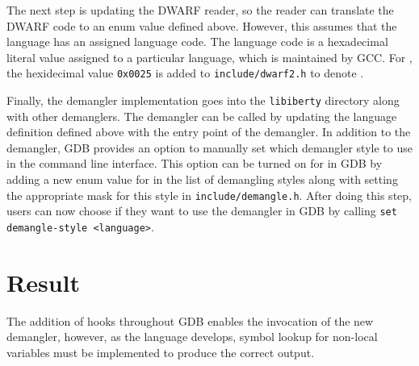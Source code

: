 The next step is updating the DWARF reader, so the reader can translate the DWARF code to an enum value defined
above. However, this assumes that the language has an assigned language code.
The language code is a hexadecimal literal value assigned to a particular
language, which is maintained by GCC. For \CFA, the hexidecimal value
\verb|0x0025| is added to \verb|include/dwarf2.h| to denote \CFA.

Finally, the demangler implementation goes into the \verb|libiberty| directory along with
other demanglers. The demangler can be called by updating the language
definition defined above with the entry point of the \CFAS demangler.
In addition to the demangler, GDB provides an option
to manually set which demangler style to use in the command line interface.
This option can be turned on for \CFAS in GDB by adding a new enum value for \CFAS in
the list of demangling styles along with setting the appropriate mask for this
style in \verb|include/demangle.h|. After doing this step, users can now choose
if they want to use the \CFAS demangler in GDB by calling \verb|set demangle-style <language>|.

\section{Result}
The addition of hooks throughout GDB enables the invocation of the new \CFAS demangler, however, as the
language develops, symbol lookup for non-local variables must be implemented to
produce the correct output.
